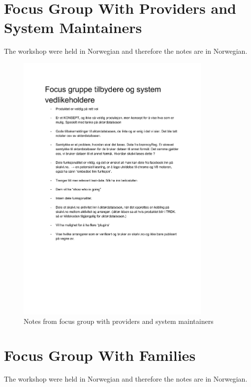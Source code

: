 \section{Focus Group With Providers and System Maintainers}
\label{workshop_with_providers_and_system_maintainers_appendix}
The workshop were held in Norwegian and therefore the notes are in Norwegian.

\begin{figure}[H]
\centering
    \includegraphics[width=0.85\textwidth]{fig/focusgroup/FGProviders.pdf}
    \caption{Notes from focus group with providers and system maintainers}
    \label{Providers_1}
\end{figure}

\section{Focus Group With Families}
\label{workshop_with_families_appendix}
The workshop were held in Norwegian and therefore the notes are in Norwegian.

